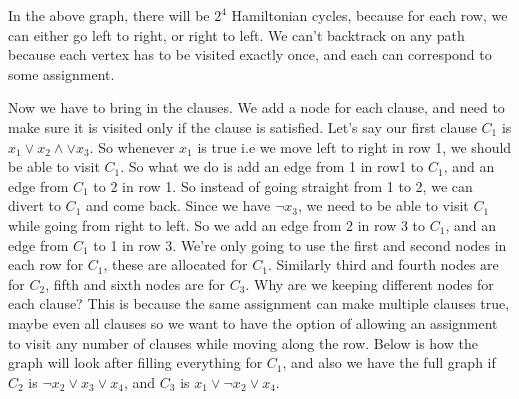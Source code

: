 \documentclass[12pt]{report}
\begin{document}
\begin{enumerate}[label=\textbf{\arabic*.}]
    In the above graph, there will be $2^4$ Hamiltonian cycles, because for each row, we can either go left to right, or right to left. We can't 
    backtrack on any path because each vertex has to be visited exactly once, and each can correspond to some assignment.

    Now we have to bring in the clauses. We add a node for each clause, and need to make sure it is visited only if the clause is satisfied.
    Let's say our first clause $C_1$ is $x_1 \lor x_2 \land \lor x_3$. So whenever $x_1$ is true i.e we move left to right in row 1, we should 
    be able to visit $C_1$. So what we do is add an edge from 1 in row1 to $C_1$, and an edge from $C_1$ to 2 in row 1. So instead of going straight
    from 1 to 2, we can divert to $C_1$ and come back. Since we have $\lnot x_3$, we need to be able to visit $C_1$ while going from right to left.
    So we add an edge from 2 in row 3 to $C_1$, and an edge from $C_1$ to 1 in row 3. We're only going to use the first and second nodes in each row 
    for $C_1$, these are allocated for $C_1$. Similarly third and fourth nodes are for $C_2$, fifth and sixth nodes are for $C_3$. Why are we keeping
    different nodes for each clause? This is because the same assignment can make multiple clauses true, maybe even all clauses so we want to have
    the option of allowing an assignment to visit any number of clauses while moving along the row. Below is how the graph will look after filling
    everything for $C_1$, and also we have the full graph if $C_2$ is $\lnot x_2 \lor x_3 \lor x_4$, and $C_3$ is $x_1 \lor \lnot x_2 \lor x_4$.


\end{enumerate}
\end{document}
